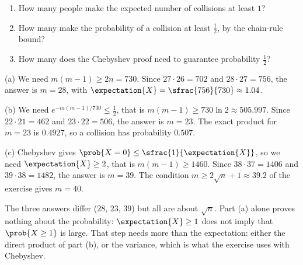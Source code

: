 \begin{exercisebox}
\begin{pproblem}[The numbers for $n = 365$]\label{pp:bday365}
    \leavevmode
    \begin{enumerate}[label=(\alph*)]
        \item How many people make the expected number of collisions at least $1$?
        \item How many make the probability of a collision at least $\frac{1}{2}$, by the chain-rule
              bound?
        \item How many does the Chebyshev proof need to guarantee probability $\frac{1}{2}$?
    \end{enumerate}
\end{pproblem}
\tcblower
\begin{wsolution}
    (a) We need $m(m-1) \geq 2n = 730$. Since $27 \cdot 26 = 702$ and $28 \cdot 27 = 756$, the
    answer is $m = 28$, with $\expectation{X} = \sfrac{756}{730} \approx 1.04$.

    (b) We need $e^{-m(m-1)/730} \leq \frac{1}{2}$, that is $m(m-1) \geq 730 \ln 2 \approx 505.997$.
    Since $22 \cdot 21 = 462$ and $23 \cdot 22 = 506$, the answer is $m = 23$. The exact product for
    $m = 23$ is $0.4927$, so a collision has probability $0.507$.

    (c) Chebyshev gives $\prob{X = 0} \leq \sfrac{1}{\expectation{X}}$, so we need
    $\expectation{X} \geq 2$, that is $m(m-1) \geq 1460$. Since $38 \cdot 37 = 1406$ and
    $39 \cdot 38 = 1482$, the answer is $m = 39$. The condition $m \geq 2\sqrt{n} + 1 \approx 39.2$
    of the exercise gives $m = 40$.

    The three answers differ ($28$, $23$, $39$) but all are about $\sqrt{n}$. Part (a) alone proves
    nothing about the probability: $\expectation{X} \geq 1$ does not imply that
    $\prob{X \geq 1}$ is large. That step needs more than the expectation: either the direct
    product of part (b), or the variance, which is what the exercise uses with Chebyshev.
\end{wsolution}
\end{exercisebox}
